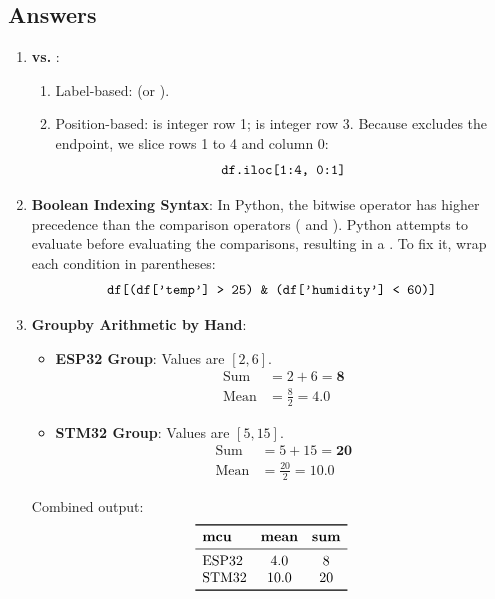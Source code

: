 \subsection*{Answers}

\begin{enumerate}
    \item \textbf{ vs. }:
    \begin{enumerate}[label=(\alph*)]
        \item Label-based:  (or ).
        \item Position-based:  is integer row 1;  is integer row 3. Because  excludes the endpoint, we slice rows 1 to 4 and column 0:
        \begin{equation*}
        \code{df.iloc[1:4, 0:1]}
        \end{equation*}
    \end{enumerate}

    \item \textbf{Boolean Indexing Syntax}:
    In Python, the bitwise operator \code{&} has higher precedence than the comparison operators (\code{>} and \code{<}). Python attempts to evaluate  before evaluating the comparisons, resulting in a . 
    To fix it, wrap each condition in parentheses:
    \begin{equation*}
    \code{df[(df['temp'] > 25) & (df['humidity'] < 60)]}
    \end{equation*}

    \item \textbf{Groupby Arithmetic by Hand}:
    \begin{itemize}
        \item \textbf{ESP32 Group}: Values are $[2, 6]$.
        \begin{align*}
        \text{Sum} &= 2 + 6 = \mathbf{8} \\
        \text{Mean} &= \frac{8}{2} = \mathbf{4.0}
        \end{align*}
        \item \textbf{STM32 Group}: Values are $[5, 15]$.
        \begin{align*}
        \text{Sum} &= 5 + 15 = \mathbf{20} \\
        \text{Mean} &= \frac{20}{2} = \mathbf{10.0}
        \end{align*}
    \end{itemize}
    Combined output:
    \begin{equation*}
    \begin{array}{lcc}
    \toprule
    \textbf{mcu} & \textbf{mean} & \textbf{sum} \\
    \midrule
    \text{ESP32} & 4.0 & 8 \\
    \text{STM32} & 10.0 & 20 \\
    \bottomrule
    \end{array}
    \end{equation*}


\end{enumerate}
